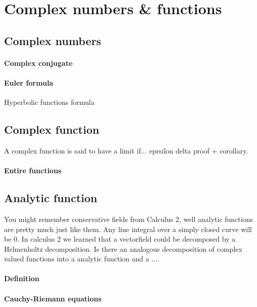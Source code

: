 \section{Complex numbers & functions}

\subsection{Complex numbers}

\paragraph{Complex conjugate}
\paragraph{Euler formula}

Hyperbolic functions formula

\subsection{Complex function}
A complex function is said to have a limit if... eprsilon delta proof
+ corollary.

\paragraph{Entire functions}


\subsection{Analytic function}
You might remember conservative fields from Calculus 2, well analytic
functions are pretty much just like them. Any line integral over a
simply closed curve will be 0. In calculus 2 we learned that a
vectorfield could be decomposed by a Helmenholtz decomposition. Is
there an analogous decomposition of complex valued functions into a
analytic function and a ....



\paragraph{Definition}

\paragraph{Cauchy-Riemann equations}

